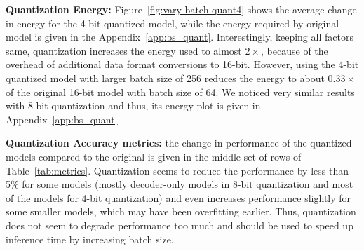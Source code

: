\vspace{2mm}
\noindent \textbf{Quantization Energy:}
%
%
%
Figure~\ref{fig:vary-batch-quant4} shows the average change in energy for the 4-bit quantized model, while the energy required by original model is given in the Appendix~\ref{app:bs_quant}. Interestingly, keeping all factors same, quantization increases the energy used to almost $2\times$, because of the overhead of additional data format conversions to 16-bit. However, using the 4-bit quantized model with larger batch size of 256 reduces the energy to about $0.33\times$ of the original 16-bit model with batch size of 64.
%
We noticed very similar results with 8-bit quantization and thus, its energy plot is given in Appendix~\ref{app:bs_quant}.



\vspace{2mm}
\noindent \textbf{Quantization Accuracy metrics:} the change in performance of the quantized models compared to the original is given in the middle set of rows of Table~\ref{tab:metrics}. Quantization seems to reduce the performance by less than 5\% for some models (mostly decoder-only models in 8-bit quantization and most of the models for 4-bit quantization) and even increases performance slightly for some smaller models, which may have been overfitting earlier.
%
Thus, quantization does not seem to degrade performance too much and should be used to speed up inference time by increasing batch size.



